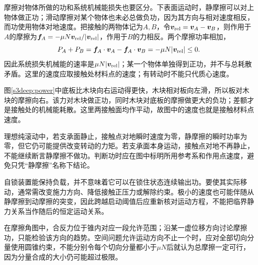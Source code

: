 摩擦对物体所做的功和系统机械能损失也要区分。下表面运动时，静摩擦可以对上物体做正功；滑动摩擦对某个物体也未必总做负功，因为其方向与相对速度相反，而功使用物体对地速度。把接触的两物体记为$A,B$，令$\boldsymbol v_{\rm rel}=\boldsymbol v_A-\boldsymbol v_B$，则作用于$A$的摩擦为$\boldsymbol f_A=-\mu N\boldsymbol v_{\rm rel}/|\boldsymbol v_{\rm rel}|$，作用于$B$的力相反。两个摩擦功率相加，
\[
P_A+P_B=\boldsymbol f_A\cdot\boldsymbol v_A
-\boldsymbol f_A\cdot\boldsymbol v_B
=-\mu N|\boldsymbol v_{\rm rel}|\le0.
\]
因此系统损失机械能的速率是$\mu N|\boldsymbol v_{\rm rel}|$；某一个物体单独得到正功，并不与总耗散矛盾。这里的速度应取接触处材料点的速度；有转动时不能只代质心速度。

图\ref{s3deep:power}中底板比木块向右运动得更快，木块相对板向左滑，所以板对木块的摩擦向右。该力对木块做正功，同时木块对底板的摩擦做更大的负功；差额才是接触处的机械能耗散。这里两接触面均作平动，故图中的速度也就是接触材料点速度。


理想纯滚动中，若支承面静止，接触点对地瞬时速度为零，静摩擦的瞬时功率为零，但它仍可能提供改变转动的力矩。若支承面本身运动，接触点对地不再静止，不能继续断言静摩擦不做功。判断功时应在图中标明所用参考系和作用点速度，避免只凭“静摩擦”名称下结论。

自锁装置能保持负载，并不意味着它可以在锁住状态连续输出功。要使其实际移动，通常需改变施力方向、降低接触正压力或解除约束。极小的速度也可能伴随从静摩擦到动摩擦的突变，因此跨越启动阈值后应重新核对运动方程，不能把临界静力关系当作随后的恒定运动关系。

在摩擦角图中，合反力位于锥内对应一段允许范围；沿某一虚位移方向讨论摩擦功，只能检验该方向的趋势。空间问题允许运动方向不止一个时，应对全部切向分量使用圆锥约束，不能分别令每个切向分量都小于$\mu N$后就认为总摩擦一定可行，因为分量合成的大小仍可能超过极限。

